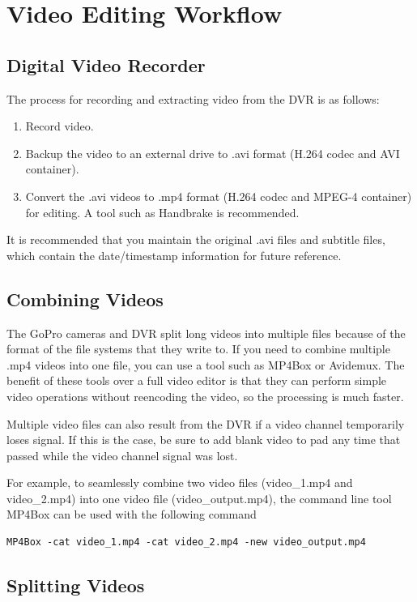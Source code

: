 \documentclass[11pt,oneside]{book}
\begin{document}
\section{Video Editing Workflow}

\subsection{Digital Video Recorder}

The process for recording and extracting video from the DVR is as follows:
\begin{enumerate}
\item Record video.
\item Backup the video to an external drive to .avi format (H.264 codec and AVI container).
\item Convert the .avi videos to .mp4 format (H.264 codec and MPEG-4 container) for editing. A tool such as Handbrake is recommended.
\end{enumerate}
It is recommended that you maintain the original .avi files and subtitle files, which contain the date/timestamp information for future reference.

\subsection{Combining Videos}

The GoPro cameras and DVR split long videos into multiple files because of the format of the file systems that they write to. If you need to combine multiple .mp4 videos into one file, you can use a tool such as MP4Box or Avidemux. The benefit of these tools over a full video editor is that they can perform simple video operations without reencoding the video, so the processing is much faster. 

Multiple video files can also result from the DVR if a video channel temporarily loses signal. If this is the case, be sure to add blank video to pad any time that passed while the video channel signal was lost.

For example, to seamlessly combine two video files (video\_1.mp4 and video\_2.mp4) into one video file (video\_output.mp4), the command line tool MP4Box can be used with the following command

\begin{verbatim}
MP4Box -cat video_1.mp4 -cat video_2.mp4 -new video_output.mp4
\end{verbatim}

\subsection{Splitting Videos}
\end{document}
